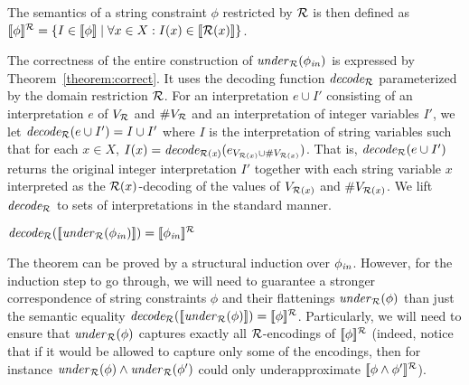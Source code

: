 \documentclass[sigplan,review,anonymous]{acmart}\settopmatter{printfolios=true,printccs=false,printacmref=false}
\begin{document}

The semantics of a string constraint $\phi$ restricted by $\mathcal{R}$ is then defined as 
$[\![\phi]\!]^{\mathcal{R}} = \{I\in[\![\phi]\!] \mid \forall x\in X:I(x)\in[\![\mathcal{R}(x)]\!]\}$.



The correctness of the entire construction of $\mathit{under}_{\mathcal{R}}(\phi_{\mathit{in}})$ is expressed by  Theorem~\ref{theorem:correct}. 
It uses the decoding function $\mathit{decode_{\mathcal{R}}}$ parameterized by the domain restriction $\mathcal{R}$. 
For an interpretation $e \cup I'$ consisting of an interpretation $e$ of $V_{\mathcal{R}}$ and $\#V_{\mathcal{R}}$ and an interpretation of integer variables $I'$, we let $\mathit{decode_{\mathcal{R}}} (e\cup I') = I \cup I'$ where $I$ is the interpretation of string variables such that for each $x\in X$,
$I(x) = \mathit{decode_{\mathcal{R}(x)}} (e_{V_{\mathcal{R}(x)}\cup \#V_{\mathcal{R}(x)}})$. That is, $\mathit{decode_{\mathcal{R}}} (e\cup I')$ returns the original integer interpretation $I'$ together with each string variable $x$ interpreted as the ${\mathcal{R}(x)}$-decoding of the values of $V_{\mathcal{R}(x)}$ and $\#V_{\mathcal{R}(x)}$. 
We lift $\mathit{decode_{\mathcal{R}}}$ to sets of interpretations in the standard manner.
\begin{theorem}\label{theorem:correct}
$\mathit{decode_{\mathcal{R}}} ([\![\mathit{under}_{\mathcal{R}}(\phi_{\mathit{in}})]\!]) = [\![\phi_{\mathit{in}}]\!]^{\mathcal{R}}$ 
\end{theorem}

The theorem can be proved by a structural induction over $\phi_{\mathit{in}}$.
However, for the induction step to go through, we will need to guarantee a stronger correspondence of string constraints $\phi$ and their flattenings $\mathit{under}_{\mathcal{R}}(\phi)$ than just the semantic equality $\mathit{decode_{\mathcal{R}}} ([\![\mathit{under}_{\mathcal{R}}(\phi)]\!]) = [\![\phi]\!]^{\mathcal{R}}$.  
Particularly, we will need to
 ensure that $\mathit{under}_{\mathcal{R}}(\phi)$ captures exactly all $\mathcal{R}$-encodings of $[\![\phi]\!]^{\mathcal{R}}$
(indeed, notice that if it would be allowed to capture only some of the encodings, then for instance $\mathit{under}_{\mathcal{R}}(\phi) \land \mathit{under}_{\mathcal{R}}(\phi')$ could only underapproximate $[\![\phi\land\phi']\!]^{\mathcal{R}}$).

\end{document}
